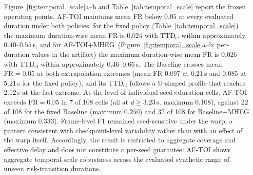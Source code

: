 \documentclass[a4paper,fleqn]{cas-dc}
\newcommand{\MHEG}{\mbox{MHEG}\xspace}
\begin{document}
{Figure~\ref{fig:temporal_scale}a--b and Table~\ref{tab:temporal_scale}
report the frozen operating points. \mbox{AF-TOI} maintains mean FR below
$0.05$ at every evaluated duration under both policies: for the fixed policy
(Table~\ref{tab:temporal_scale}) the maximum duration-wise mean FR is
$0.024$ with $\mathrm{TTD}_{\mathrm{ef}}$ within approximately
$0.40$--$0.55$\,s, and for \mbox{AF-TOI}+\MHEG\
(Figure~\ref{fig:temporal_scale}a--b; per-duration values in the artifact) the
maximum duration-wise mean FR is $0.026$ with $\mathrm{TTD}_{\mathrm{ef}}$
within approximately $0.46$--$0.66$\,s. The Baseline crosses mean
$\mathrm{FR}=0.05$ at both extrapolation extremes (mean FR $0.097$ at $0.21$\,s and $0.085$ at
$5.21$\,s for the fixed policy), and its $\mathrm{TTD}_{\mathrm{ef}}$
follows a U-shaped profile that reaches $2.12$\,s at the fast extreme. At
the level of individual seed$\times$duration cells, \mbox{AF-TOI} exceeds
$\mathrm{FR}=0.05$ in 7 of 108 cells (all at $d\ge3.23$\,s, maximum
$0.108$), against 22 of 108 for the fixed Baseline (maximum $0.250$) and 32
of 108 for Baseline+MHEG (maximum $0.333$). Frame-level F1 remained
seed-sensitive under the warp, a pattern consistent with checkpoint-level
variability rather than with an effect of the warp itself. Accordingly, the result is restricted to
aggregate coverage and effective delay and does not constitute a per-seed
guarantee: \mbox{AF-TOI} shows aggregate temporal-scale robustness across
the evaluated synthetic range of unseen risk-transition durations.

}
\end{document}
